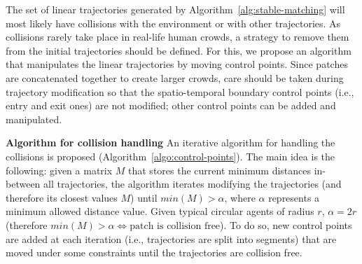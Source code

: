
The set of linear trajectories generated by Algorithm~\ref{alg:stable-matching} will most likely have collisions with the environment or with other trajectories. As collisions rarely take place in real-life human crowds, a strategy to remove them from the initial trajectories should be defined. For this, we propose an algorithm that manipulates the linear trajectories by moving control points.
Since patches are concatenated together to create larger crowds, care should be taken during trajectory modification so that the spatio-temporal boundary control points (i.e., entry and exit ones) are not modified; other control points can be added and manipulated.


\textbf{Algorithm for collision handling} An iterative algorithm for handling the collisions is proposed (Algorithm~\ref{algo:control-points}).
The main idea is the following: given a matrix $M$ that stores the current minimum distances in-between all trajectories, the algorithm iterates modifying the trajectories (and therefore its closest values $M$) until $min(M) > \alpha$, where $\alpha$ represents a minimum allowed distance value.
Given typical circular agents of radius $r$, $\alpha = 2r$ (therefore $min(M) > \alpha \Leftrightarrow \text{patch is collision free}$).
To do so, new control points are added at each iteration (i.e., trajectories are split into segments) that are moved under some constraints until the trajectories are collision free.

